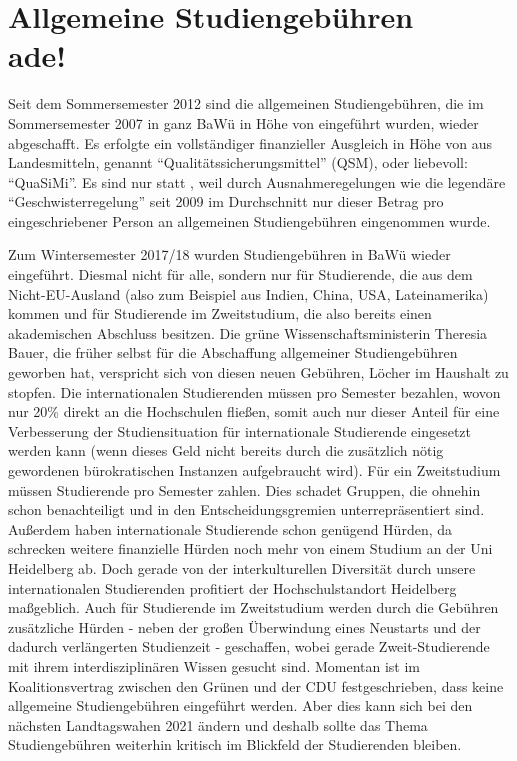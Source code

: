 \section[Allgemeine Studiengebühren ade]{Allgemeine Studiengebühren \\ade!}


Seit dem Sommersemester 2012 sind die allgemeinen Studiengebühren, die im Sommersemester 2007 in ganz BaWü in Höhe von  eingeführt wurden, wieder abgeschafft. Es erfolgte ein vollständiger finanzieller Ausgleich in Höhe von  aus Landesmitteln, genannt “Qualitätssicherungsmittel” (QSM), oder liebevoll: “QuaSiMi”. Es sind nur  statt , weil durch Ausnahmeregelungen wie die legendäre “Geschwisterregelung” seit 2009 im Durchschnitt nur dieser Betrag pro eingeschriebener Person an allgemeinen Studiengebühren eingenommen wurde.

Zum Wintersemester 2017/18 wurden Studiengebühren in BaWü wieder eingeführt. Diesmal nicht für alle, sondern nur für Studierende, die aus dem Nicht-EU-Ausland (also zum Beispiel aus Indien, China, USA, Lateinamerika) kommen und für Studierende im Zweitstudium, die also bereits einen akademischen Abschluss besitzen. Die grüne Wissenschaftsministerin Theresia Bauer, die früher selbst für die Abschaffung allgemeiner Studiengebühren geworben hat, verspricht sich von diesen neuen Gebühren, Löcher im Haushalt zu stopfen. Die internationalen Studierenden müssen  pro Semester bezahlen, wovon nur 20\% direkt an die Hochschulen fließen, somit auch nur dieser Anteil für eine Verbesserung der Studiensituation für internationale Studierende eingesetzt werden kann (wenn dieses Geld nicht bereits durch die zusätzlich nötig gewordenen bürokratischen Instanzen aufgebraucht wird). Für ein Zweitstudium müssen Studierende  pro Semester zahlen. Dies schadet Gruppen, die ohnehin schon benachteiligt und in den Entscheidungsgremien unterrepräsentiert sind. Außerdem haben internationale Studierende schon genügend Hürden, da schrecken weitere finanzielle Hürden noch mehr von einem Studium an der Uni Heidelberg ab. Doch gerade von der interkulturellen Diversität durch unsere internationalen Studierenden profitiert der Hochschulstandort Heidelberg maßgeblich. Auch für Studierende im Zweitstudium werden durch die Gebühren zusätzliche Hürden - neben der großen Überwindung eines Neustarts und der dadurch verlängerten Studienzeit - geschaffen, wobei gerade Zweit-Studierende mit ihrem interdisziplinären Wissen gesucht sind. Momentan ist im Koalitionsvertrag zwischen den Grünen und der CDU festgeschrieben, dass keine allgemeine Studiengebühren eingeführt werden. Aber dies kann sich bei den nächsten Landtagswahen 2021 ändern und deshalb sollte das Thema Studiengebühren weiterhin kritisch im Blickfeld der Studierenden bleiben.

